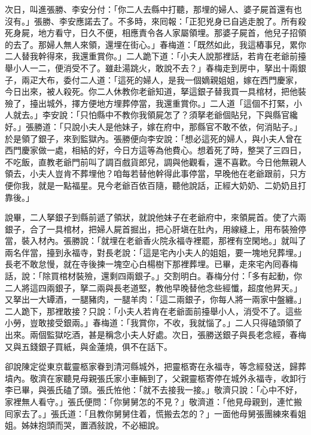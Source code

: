 次日，叫進張勝、李安分付：「你二人去縣中打聽，那埋的婦人、婆子屍首還有也沒有。」張勝、李安應諾去了。不多時，來囘報：「正犯兇身已自逃走脫了。所有殺死身屍，地方看守，日久不便，相應責令各人家屬領埋。那婆子屍首，他兒子招領的去了。那婦人無人來領，還埋在街心。」春梅道：「既然如此，我這樁事兒，累你二人替我幹得來，我還重賞你。」二人跪下道：「小夫人說那裡話，若肯在老爺前擡舉小人一二，便消受不了。雖赴湯跳火，敢說不去？」春梅走到房中，拏出十兩銀子，兩疋大布，委付二人道：「這死的婦人，是我一個嫡親姐姐，嫁在西門慶家，今日出來，被人殺死。你二人休教你老爺知道，拏這銀子替我買一具棺材，把他裝殮了，擡出城外，擇方便地方埋葬停當，我還重賞你。」二人道「這個不打緊，小人就去。」李安說：「只怕縣中不教你我領屍怎了？須拏老爺個貼兒，下與縣官纔好。」張勝道：「只說小夫人是他妹子，嫁在府中，那縣官不敢不依，何消貼子。」於是領了銀子，來到監獄內。張勝便向李安說：「想必這死的婦人，與小夫人曾在西門慶家做一處，相結的好，今日方這等為他費心。想着死了時，整哭了三四日，不吃飯，直教老爺門前叫了調百戲貨郎兒，調與他觀看，還不喜歡。今日他無親人領去，小夫人豈肯不葬埋他？咱每若替他幹得此事停當，早晚他在老爺跟前，只方便你我，就是一點福星。{}見今老爺百依百隨，聽他說話，正經大奶奶、二奶奶且打靠後。」

說畢，二人拏銀子到縣前遞了領狀，就說他妹子在老爺府中，來領屍首。使了六兩銀子，合了一具棺材，把婦人屍首掘出，把心肝塡在肚內，用線縫上，用布裝殮停當，裝入材內。{}張勝說：「就埋在老爺香火院永福寺裡罷，那裡有空閑地。」就叫了兩名伴當，擡到永福寺，對長老說：「這是宅內小夫人的姐姐，要一塊地兒葬埋。」長老不敢怠慢，就在寺後揀一塊空心白楊樹下那裡葬埋。已畢，走來宅內囘春梅話，說：「除買棺材裝殮，還剩四兩銀子。」交割明白。春梅分付：「多有起動，你二人將這四兩銀子，拏二兩與長老道堅，教他早晚替他念些經懺，超度他昇天。」又拏出一大罈酒，一腿豬肉，一腿羊肉：「這二兩銀子，你每人將一兩家中盤纏。」二人跪下，那裡敢接？只說：「小夫人若肯在老爺面前擡舉小人，消受不了。這些小勞，豈敢接受銀兩。」春梅道：「我賞你，不收，我就惱了。」二人只得磕頭領了出來。兩個監獄吃酒，甚是稱念小夫人好處。{}次日，張勝送銀子與長老念經，春梅又與五錢銀子買紙，與金蓮燒，俱不在話下。

卻說陳定從東京載靈柩家眷到清河縣城外，把靈柩寄在永福寺，等念經發送，歸葬墳內。敬濟在家聽見母親張氏家小車輛到了，父親靈柩寄停在城外永福寺，收卸行李已畢，與張氏磕了頭。張氏恠他：「就不去接我一接。」{}敬濟只說：「心中不好，家裡無人看守。」張氏便問：「你舅舅怎的不見？」敬濟道：「他見母親到，連忙搬囘家去了。」張氏道：「且教你舅舅住着，慌搬去怎的？」一面他母舅張團練來看姐姐。姊妹抱頭而哭，置酒敍說，不必細說。

